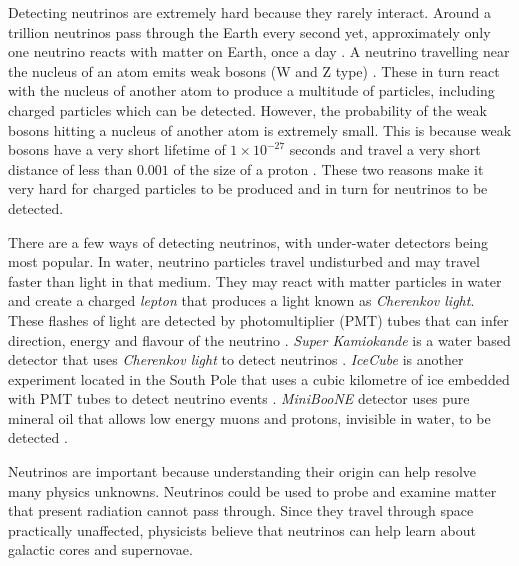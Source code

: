 Detecting neutrinos are extremely hard because they rarely interact. Around a trillion neutrinos pass through the Earth every second yet, approximately only one neutrino reacts with matter on Earth, once a day \cite{abi2018dune, acciarri2016long}.  A neutrino travelling near the nucleus of an atom emits weak bosons (W and Z type) \cite{bahcall1989neutrino}. These in turn react with the nucleus of another atom to produce a multitude of particles, including charged particles which can be detected. However, the probability of the weak bosons hitting a nucleus of another atom is extremely small. This is because weak bosons have a very short lifetime of $1 \times 10^{-27}$ seconds and travel a very short distance of less than $0.001$ of the size of a proton \cite{bahcall1989neutrino, adamson2008study, puccini2018bosons}. These two reasons make it very hard for charged particles to be produced and in turn for neutrinos to be detected. 

\label{sec:intro-detection-of-neutrinos}
There are a few ways of detecting neutrinos, with under-water detectors being most popular. In water, neutrino particles travel undisturbed and may travel faster than light in that medium. They may react with matter particles in water and create a charged \textit{lepton} that produces a light known as \textit{Cherenkov light}. These flashes of light are detected by photomultiplier (PMT) tubes that can infer direction, energy and flavour of the neutrino \cite{adamson2008study}. \textit{Super Kamiokande} is a water based detector that uses \textit{Cherenkov light} to detect neutrinos \cite{tanaka2020search}. \textit{IceCube} is another experiment located in the South Pole that uses a cubic kilometre of ice embedded with PMT tubes to detect neutrino events \cite{albert2020antares}. \textit{MiniBooNE} detector uses pure mineral oil that allows low energy muons and protons, invisible in water, to be detected \cite{aguilar2017dark}.

Neutrinos are important because understanding their origin can help resolve many physics unknowns. Neutrinos could be used to probe and examine matter that present radiation cannot pass through. Since they travel through space practically unaffected, physicists believe that neutrinos can help learn about galactic cores and supernovae. 


